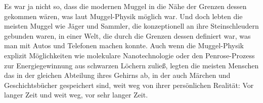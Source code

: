 Es war ja nicht so, dass die modernen Muggel in die Nähe der Grenzen dessen gekommen wären, was laut Muggel-Physik möglich war. Und doch lebten die meisten Muggel wie Jäger und Sammler, die konzeptionell an ihre Steinschleudern gebunden waren, in einer Welt, die durch die Grenzen dessen definiert war, was man mit Autos und Telefonen machen konnte. Auch wenn die Muggel-Physik explizit Möglichkeiten wie molekulare Nanotechnologie oder den Penrose-Prozess zur Energiegewinnung aus schwarzen Löchern zuließ, legten die meisten Menschen das in der gleichen Abteilung ihres Gehirns ab, in der auch Märchen und Geschichtsbücher gespeichert sind, weit weg von ihrer persönlichen Realität: Vor langer Zeit und weit weg, vor sehr langer Zeit.
